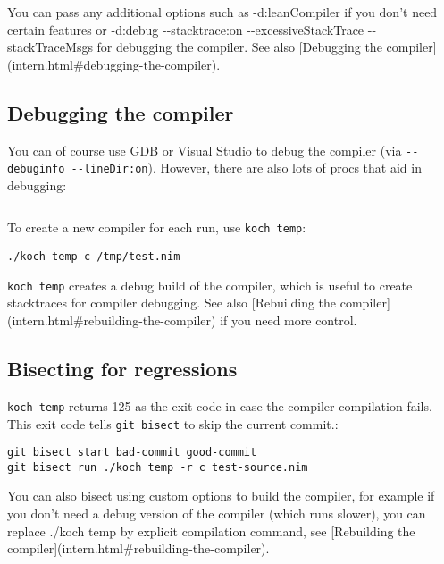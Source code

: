 You can pass any additional options such as {-d:leanCompiler} if you
don't need certain features or {-d:debug -\/-stacktrace:on
-\/-excessiveStackTrace -\/-stackTraceMsgs} for debugging the compiler.
See also {[}Debugging the
compiler{]}(intern.html\#debugging-the-compiler).

\hypertarget{debugging-the-compiler}{%
\subsection{Debugging the compiler}\label{debugging-the-compiler}}

You can of course use GDB or Visual Studio to debug the compiler (via
\texttt{-\/-debuginfo\ -\/-lineDir:on}). However, there are also lots of
procs that aid in debugging:

\begin{verbatim}
\end{verbatim}

To create a new compiler for each run, use \texttt{koch\ temp}:

\begin{verbatim}
./koch temp c /tmp/test.nim
\end{verbatim}

\texttt{koch\ temp} creates a debug build of the compiler, which is
useful to create stacktraces for compiler debugging. See also
{[}Rebuilding the compiler{]}(intern.html\#rebuilding-the-compiler) if
you need more control.

\hypertarget{bisecting-for-regressions}{%
\subsection{Bisecting for regressions}\label{bisecting-for-regressions}}

\texttt{koch\ temp} returns 125 as the exit code in case the compiler
compilation fails. This exit code tells \texttt{git\ bisect} to skip the
current commit.:

\begin{verbatim}
git bisect start bad-commit good-commit
git bisect run ./koch temp -r c test-source.nim
\end{verbatim}

You can also bisect using custom options to build the compiler, for
example if you don't need a debug version of the compiler (which runs
slower), you can replace {./koch temp} by explicit compilation command,
see {[}Rebuilding the compiler{]}(intern.html\#rebuilding-the-compiler).

